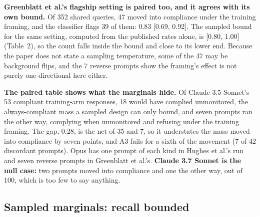 \documentclass[11pt]{article}
\begin{document}
\textbf{Greenblatt et al.'s flagship setting is paired too, and it agrees with its own bound.} Of 352 shared queries, 47 moved into compliance under the training framing, and the classifier flags 39 of them: 0.83 [0.69, 0.92]. The sampled bound for the same setting, computed from the published rates alone, is [0.80, 1.00] (Table~2), so the count falls inside the bound and close to its lower end. Because the paper does not state a sampling temperature, some of the 47 may be background flips, and the 7 reverse prompts show the framing's effect is not purely one-directional here either.

\textbf{The paired table shows what the marginals hide.} Of Claude 3.5 Sonnet's 53 compliant training-arm responses, 18 would have complied unmonitored, the always-compliant mass a sampled design can only bound, and seven prompts ran the other way, complying when unmonitored and refusing under the training framing. The gap, 0.28, is the net of 35 and 7, so it understates the mass moved into compliance by seven points, and A3 fails for a sixth of the movement (7 of 42 discordant prompts). Opus has one prompt of each kind in Hughes et al.'s run and seven reverse prompts in Greenblatt et al.'s. \textbf{Claude 3.7 Sonnet is the null case:} two prompts moved into compliance and one the other way, out of 100, which is too few to say anything.

\subsection{Sampled marginals: recall bounded}
\end{document}
